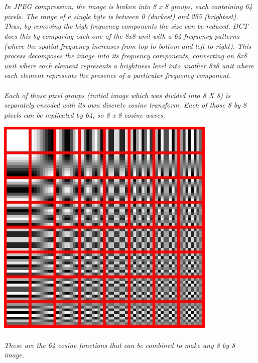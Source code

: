 \documentclass[12pt, letterpaper]{article}
\begin{document}
\paragraph{}\textit{\\In JPEG compression, the image is broken into 8 x 8 groups, each containing 64 pixels. The range of a single byte is between 0 (darkest) and 255 (brightest).  Thus, by removing the high frequency components the size can be reduced. DCT does this by comparing each one of the 8x8 unit with a 64 frequency patterns (where the spatial frequency increases from top-to-bottom and left-to-right).  This process decomposes the image into its frequency components, converting an 8x8 unit where each element represents a brightness level into another 8x8 unit where each element represents the presence of a particular frequency component.}
\paragraph{}\textit{Each of those pixel groups (initial image which was divided into 8 X 8) is separately encoded with its own discrete cosine transform. Each of those 8 by 8 pixels can be replicated by 64, so 8 x 8 cosine waves.}
\begin{center}
    \includegraphics{DCT 2D.1} 
\end{center}
\paragraph{}\textit{These are the 64 cosine functions that can be combined to make any 8 by 8 image. }
\end{document}
